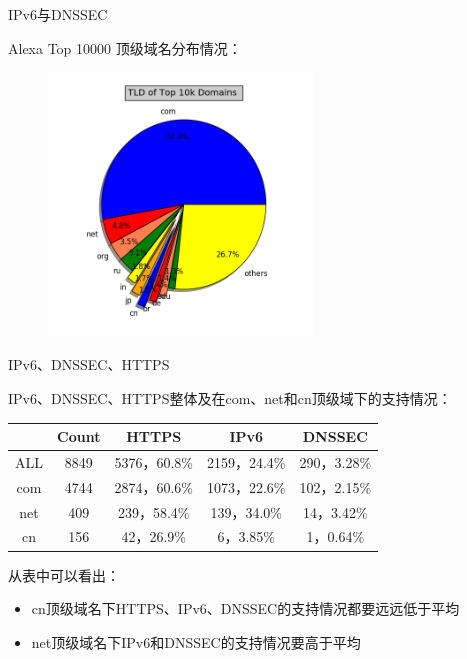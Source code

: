 \documentclass{beamer}
\begin{document}
\begin{frame}{IPv6与DNSSEC}

  Alexa Top 10000 顶级域名分布情况：

\begin{figure}
  \includegraphics[height=7cm]{images/figure/figure_2.png}
\end{figure}

\end{frame}
\begin{frame}{IPv6、DNSSEC、HTTPS}

  IPv6、DNSSEC、HTTPS整体及在com、net和cn顶级域下的支持情况：

  \begin{table}
  \begin{tabular}{c|c|c|c|c}
    \toprule
           & Count & HTTPS & IPv6 & DNSSEC \\
    \midrule
    ALL & 8849& 5376，60.8\% &2159，24.4\%& 290，3.28\% \\
    com&  4744 &2874，60.6\%& 1073，22.6\% &102，2.15\% \\
    net&409  &239，58.4\%  &139，34.0\% &14，3.42\% \\
    cn&156&42，26.9\% &6，3.85\%  & 1，0.64\% \\
    \bottomrule
    \end{tabular}
  \end{table}
  从表中可以看出：
  \begin{itemize}
    \item cn顶级域名下HTTPS、IPv6、DNSSEC的支持情况都要远远低于平均
    \item net顶级域名下IPv6和DNSSEC的支持情况要高于平均
  \end{itemize}
\end{frame}
\end{document}
